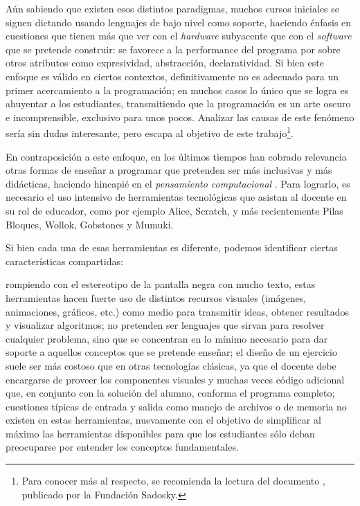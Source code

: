 Aún sabiendo que existen esos distintos paradigmas, muchos cursos iniciales se siguen dictando usando lenguajes de bajo nivel como soporte, haciendo énfasis en cuestiones que tienen más que ver con el \textit{hardware} subyacente que con el \textit{software} que se pretende construir: se favorece a la performance del programa por sobre otros atributos como expresividad, abstracción, declaratividad. Si bien este enfoque es válido en ciertos contextos, definitivamente no es adecuado para un primer acercamiento a la programación; en muchos casos lo único que se logra es ahuyentar a los estudiantes, transmitiendo que la programación es un arte oscuro e incomprensible, exclusivo para unos pocos. Analizar las causas de este fenómeno sería sin dudas interesante, pero escapa al objetivo de este trabajo\footnote{Para conocer más al respecto, se recomienda la lectura del documento , publicado por la Fundación Sadosky.}.

En contraposición a este enfoque, en los últimos tiempos han cobrado relevancia otras formas de enseñar a programar que pretenden ser más inclusivas y más didácticas, haciendo hincapié en el \textit{pensamiento computacional} \cite{Wing}. Para lograrlo, es necesario el uso intensivo de herramientas tecnológicas que asistan al docente en su rol de educador, como por ejemplo Alice, Scratch, y más recientemente Pilas Bloques, Wollok, Gobstones y Mumuki.

Si bien cada una de esas herramientas es diferente, podemos identificar ciertas características compartidas:
\begin{itemize}
   rompiendo con el estereotipo de la pantalla negra con mucho texto, estas herramientas hacen fuerte uso de distintos recursos visuales (imágenes, animaciones, gráficos, etc.) como medio para transmitir ideas, obtener resultados y visualizar algoritmos;
   no pretenden ser lenguajes que sirvan para resolver cualquier problema, sino que se concentran en lo mínimo necesario para dar soporte a aquellos conceptos que se pretende enseñar;
   el diseño de un ejercicio suele ser más costoso que en otras tecnologías clásicas, ya que el docente debe encargarse de proveer los componentes visuales y muchas veces código adicional que, en conjunto con la solución del alumno, conforma el programa completo;
   cuestiones típicas de entrada y salida como manejo de archivos o de memoria no existen en estas herramientas, nuevamente con el objetivo de simplificar al máximo las herramientas disponibles para que los estudiantes sólo deban preocuparse por entender los conceptos fundamentales.
\end{itemize}

